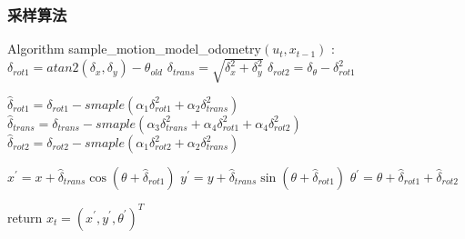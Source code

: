 \begin{frame}[fragile]
  \frametitle{采样算法}


    \begin{algorithmic}[frame = shadowbox]
        \State Algorithm sample\_motion\_model\_odometry$(u_t, x_{t-1})$ :
        \State $\delta_{rot1} = atan2(\delta_x, \delta_y) - \theta_{old}$
        \State $\delta_{trans} = \sqrt{\delta_x^2 + \delta_y^2}$
        \State $\delta_{rot2} = \delta_\theta - \delta_{rot1}^2$

        \State $\hat{\delta}_{rot1} = \delta_{rot1} - smaple(\alpha_1 \delta_{rot1}^2 + \alpha_2 \delta_{trans}^2)$
        \State $\hat{\delta}_{trans} = \delta_{trans} - smaple(\alpha_3 \delta_{trans}^2 + \alpha_4 \delta_{rot1}^2 + \alpha_4 \delta_{rot2}^2)$
        \State $\hat{\delta}_{rot2} = \delta_{rot2} - smaple(\alpha_1 \delta_{rot2}^2 + \alpha_2 \delta_{trans}^2)$

        \State $x^\prime = x + \hat{\delta}_{trans} \cos(\theta + \hat{\delta}_{rot1})$
        \State $y^\prime = y + \hat{\delta}_{trans} \sin(\theta + \hat{\delta}_{rot1})$
        \State $\theta^\prime = \theta + \hat{\delta}_{rot1}  + \hat{\delta}_{rot2}$

        \State return $x_t = (x^\prime, y^\prime, \theta^\prime)^T$

    \end{algorithmic}

\end{frame}


